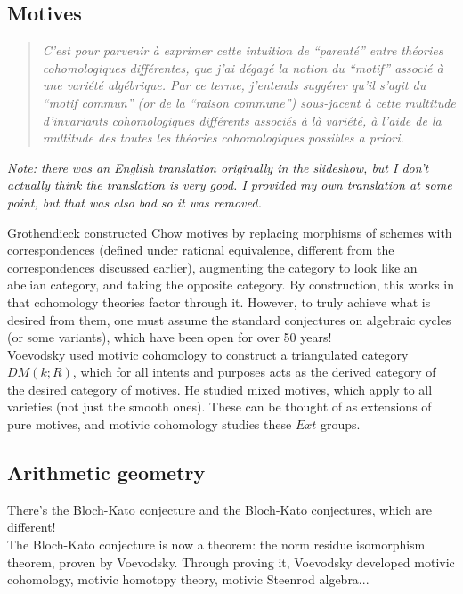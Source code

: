 \documentclass[leqno, openany]{memoir}
\theoremstyle{definition}
\theoremstyle{remark}
\theoremstyle{plain}
\theoremstyle{definition}
\theoremstyle{remark}
\begin{document}
\subsection{Motives} 
\begin{quotation}
    \textit{C'est pour parvenir \`a exprimer cette intuition de ``parent\'e'' entre th\'eories cohomologiques diff\'erentes, que j'ai d\'egag\'e la notion du ``motif'' associ\'e \`a une vari\'et\'e alg\'ebrique. Par ce terme, j'entends sugg\'erer qu'il s'agit du ``motif commun'' (or de la ``raison commune'') sous-jacent \`a cette multitude d'invariants cohomologiques diff\'erents associ\'es \`a l\`a vari\'et\'e, \`a l'aide de la multitude des toutes les th\'eories cohomologiques possibles a priori.} 
\end{quotation}
\textit{Note: there was an English translation originally in the slideshow, but I don't actually think the translation is very good. I provided my own translation at some point, but that was also bad so it was removed.} 

Grothendieck constructed Chow motives by replacing morphisms of schemes with correspondences (defined under rational equivalence, different from the correspondences discussed earlier), augmenting the category to look like an abelian category, and taking the opposite category.  By construction, this works in that cohomology theories factor through it.  However, to truly achieve what is desired from them, one must assume the standard conjectures on algebraic cycles (or some variants), which have been open for over 50 years! \\ 

Voevodsky used motivic cohomology to construct a triangulated category $DM(k; R)$, which for all intents and purposes acts as the derived category of the desired category of motives.  He studied mixed motives, which apply to all varieties (not just the smooth ones).  These can be thought of as extensions of pure motives, and motivic cohomology studies these $Ext$ groups.  

\subsection{Arithmetic geometry} 
There's the Bloch-Kato conjecture and the Bloch-Kato conjectures, which are different! \\ 

The Bloch-Kato conjecture is now a theorem: the norm residue isomorphism theorem, proven by Voevodsky.  Through proving it, Voevodsky developed motivic cohomology, motivic homotopy theory, motivic Steenrod algebra... \\
\end{document}
